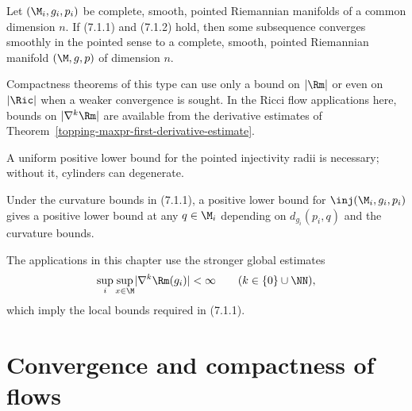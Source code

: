 \begin{theorem}
\label{topping-ch7-compactness-manifolds}
Let $(\M_i,g_i,p_i)$ be complete, smooth, pointed Riemannian manifolds of a
common dimension $n$. If (7.1.1) and (7.1.2) hold, then some subsequence
converges smoothly in the pointed sense to a complete, smooth, pointed
Riemannian manifold $(\M,g,p)$ of dimension $n$.
\end{theorem}

\begin{remark}
\label{topping-ch7-curvature-control-needed}
Compactness theorems of this type can use only a bound on $\lvert\Rm\rvert$ or
even on $\lvert\Ric\rvert$ when a weaker convergence is sought. In the Ricci
flow applications here, bounds on $\lvert\nabla^k\Rm\rvert$ are available from
the derivative estimates of Theorem~\ref{topping-maxpr-first-derivative-estimate}.
\end{remark}

\begin{remark}
\label{topping-ch7-injectivity-radius-needed}
A uniform positive lower bound for the pointed injectivity radii is necessary;
without it, cylinders can degenerate.
\end{remark}

\begin{remark}
\label{topping-ch7-injectivity-radius-propagation}
Under the curvature bounds in (7.1.1), a positive lower bound for
$\inj(\M_i,g_i,p_i)$ gives a positive lower bound at any $q\in\M_i$ depending
on $d_{g_i}(p_i,q)$ and the curvature bounds.
\end{remark}

\begin{remark}
\label{topping-ch7-compactness-usage}
The applications in this chapter use the stronger global estimates
\[
\sup_i\sup_{x\in\M}\lvert\nabla^k\Rm(g_i)\rvert<\infty
\qquad (k\in\{0\}\cup\NN),
\]
which imply the local bounds required in (7.1.1).
\end{remark}

\section{Convergence and compactness of flows}

